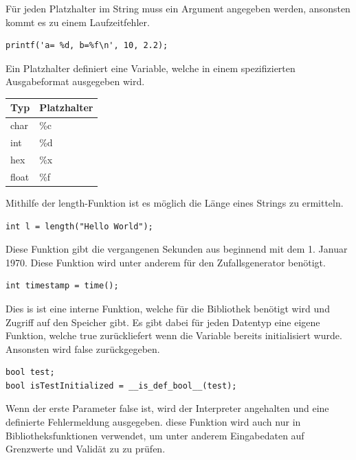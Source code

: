 F\"ur jeden Platzhalter im String muss ein Argument angegeben werden, ansonsten kommt es zu einem Laufzeitfehler.

\begin{lstlisting}[language=CMM]
printf('a= %d, b=%f\n', 10, 2.2);
\end{lstlisting}


Ein Platzhalter definiert eine Variable, welche in einem spezifizierten Ausgabeformat ausgegeben wird. 

 \begin{tabular}{l | l}
  Typ & Platzhalter \\
  \hline
  char & \%c \\
  int & \%d \\
  hex & \%x \\
  float & \%f \\
 \end{tabular}


Mithilfe der length-Funktion ist es m\"oglich die L\"ange eines Strings zu ermitteln.

\begin{lstlisting}[language=CMM]
int l = length("Hello World");
\end{lstlisting}


Diese Funktion gibt die vergangenen Sekunden aus beginnend mit dem 1. Januar 1970. Diese Funktion wird unter anderem f\"ur den Zufallsgenerator ben\"otigt.

\begin{lstlisting}[language=CMM]
int timestamp = time();
\end{lstlisting}


Dies is ist eine interne Funktion, welche f\"ur die Bibliothek ben\"otigt wird und Zugriff auf den Speicher gibt. Es gibt dabei f\"ur jeden Datentyp eine eigene Funktion, welche true zur\"uckliefert wenn die Variable bereits initialisiert wurde. Ansonsten wird false zur\"uckgegeben.

\begin{lstlisting}[language=CMM]
bool test;
bool isTestInitialized = __is_def_bool__(test);
\end{lstlisting}


Wenn der erste Parameter false ist, wird der Interpreter angehalten und eine definierte Fehlermeldung ausgegeben. diese Funktion wird auch nur in Bibliotheksfunktionen verwendet, um unter anderem Eingabedaten auf Grenzwerte und Valid\"at zu zu pr\"ufen.

